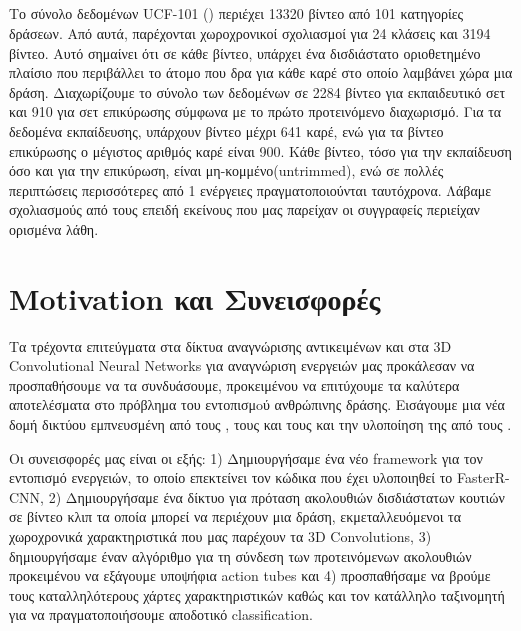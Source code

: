 \subsection{}
Το σύνολο δεδομένων \en UCF-101 (\cite{soomro2012ucf101}) \gr περιέχει 13320 βίντεο από 101 κατηγορίες δράσεων.
Από αυτά, παρέχονται χωροχρονικοί  σχολιασμοί για 24 κλάσεις  και 3194 βίντεο. Αυτό σημαίνει ότι σε κάθε βίντεο, υπάρχει ένα δισδιάστατο οριοθετημένο πλαίσιο που περιβάλλει
το άτομο που δρα για κάθε καρέ στο οποίο λαμβάνει χώρα μια δράση.
Διαχωρίζουμε το σύνολο των δεδομένων  σε 2284 βίντεο για εκπαιδευτικό σετ και 910 για σετ επικύρωσης σύμφωνα με το
πρώτο προτεινόμενο διαχωρισμό. Για τα δεδομένα εκπαίδευσης, υπάρχουν βίντεο μέχρι 641 καρέ, ενώ για τα βίντεο επικύρωσης ο μέγιστος αριθμός καρέ είναι 900.
Κάθε βίντεο, τόσο για την εκπαίδευση όσο και για την επικύρωση, είναι μη-κομμένο(\en untrimmed\gr), ενώ σε πολλές περιπτώσεις  περισσότερες από 1 ενέργειες πραγματοποιούνται ταυτόχρονα.
Λάβαμε σχολιασμούς από τους \en \cite{singh2016online} \gr επειδή εκείνους που μας παρείχαν οι συγγραφείς περιείχαν ορισμένα λάθη.

\section{\en Motivation \gr και Συνεισφορές}
Τα τρέχοντα επιτεύγματα στα δίκτυα αναγνώρισης αντικειμένων και στα \en 3D Convolutional Neural Networks \gr για  αναγνώριση ενεργειών μας προκάλεσαν να προσπαθήσουμε να τα συνδυάσουμε,
προκειμένου να επιτύχουμε τα καλύτερα αποτελέσματα στο πρόβλημα του εντοπισμoύ ανθρώπινης δράσης. Εισάγουμε μια νέα δομή δικτύου εμπνευσμένη από τους
\en\cite{DBLP:journals/corr/HouCS17}\gr, τους \en\cite{DBLP:journals/corr/abs-1712-09184}\gr και τους \en \cite{Ren:2015:FRT:2969239.2969250} \gr και την  υλοποίηση της
από τους \en \cite{jjfaster2rcnn}\gr.

Οι συνεισφορές μας είναι οι εξής: 1) Δημιουργήσαμε ένα νέο \en framework \gr για τον εντοπισμό ενεργειών, το οποίο επεκτείνει τον κώδικα που έχει υλοποιηθεί το \en FasterR-CNN\gr,
2) Δημιουργήσαμε ένα δίκτυο για  πρόταση ακολουθιών δισδιάστατων κουτιών σε βίντεο κλιπ τα οποία μπορεί να περιέχουν μια δράση, εκμεταλλευόμενοι 
τα χωροχρονικά χαρακτηριστικά που μας παρέχουν τα \en 3D Convolutions\gr, 3) δημιουργήσαμε έναν αλγόριθμο  για τη σύνδεση των προτεινόμενων ακολουθιών
προκειμένου να εξάγουμε υποψήφια \en action tubes \gr και 4) προσπαθήσαμε να βρούμε τους καταλληλότερους χάρτες χαρακτηριστικών καθώς και τον κατάλληλο ταξινομητή για να
πραγματοποιήσουμε αποδοτικό \en classification\gr.
